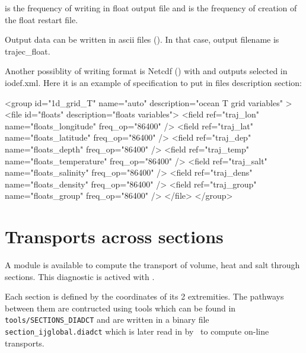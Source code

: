 \documentclass[../main/NEMO_manual]{subfiles}
\begin{document}
 is the frequency of writing in float output file and  is the frequency of
creation of the float restart file.

Output data can be written in ascii files ().
In that case, output filename is trajec\_float.

Another possiblity of writing format is Netcdf () with
 and outputs selected in iodef.xml.
Here it is an example of specification to put in files description section:

\begin{xmllines}
<group id="1d_grid_T" name="auto" description="ocean T grid variables" >
   <file id="floats"  description="floats variables">
      <field ref="traj_lon"   name="floats_longitude"   freq_op="86400" />
      <field ref="traj_lat"   name="floats_latitude"    freq_op="86400" />
      <field ref="traj_dep"   name="floats_depth"       freq_op="86400" />
      <field ref="traj_temp"  name="floats_temperature" freq_op="86400" />
      <field ref="traj_salt"  name="floats_salinity"    freq_op="86400" />
      <field ref="traj_dens"  name="floats_density"     freq_op="86400" />
      <field ref="traj_group" name="floats_group"       freq_op="86400" />
   </file>
</group>
\end{xmllines}

\section[Transports across sections]{Transports across sections}
\label{sec:DIA_diag_dct}

\begin{listing}
  \caption{}
  \label{lst:nam_diadct}
\end{listing}

A module is available to compute the transport of volume, heat and salt through sections.
This diagnostic is actived with .

Each section is defined by the coordinates of its 2 extremities.
The pathways between them are contructed using tools which can be found in \texttt{tools/SECTIONS\_DIADCT}
and are written in a binary file \texttt{section\_ijglobal.diadct} which is later read in by
\NEMO\ to compute on-line transports.
\end{document}
